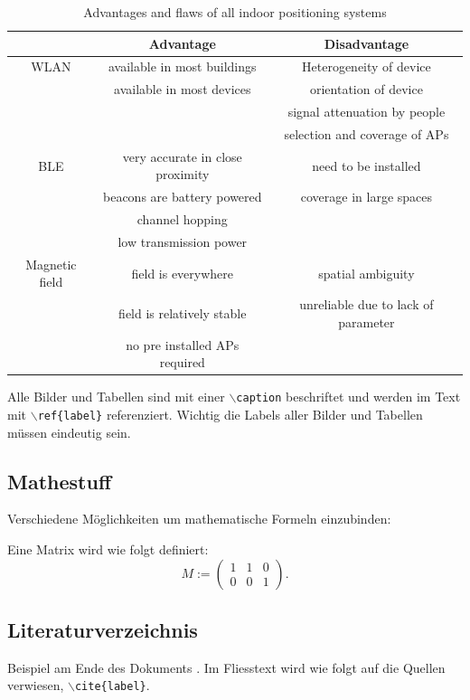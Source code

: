 	 \begin{table}[ht]
		\caption{Advantages and flaws of all indoor positioning systems}
		\label{pro-con}
		\begin{center}
			\begin{tabular}{|c|c|c|} \hline
				& Advantage & Disadvantage \\ \hline
				WLAN & available in most buildings & Heterogeneity of device \\
				& available in most devices & orientation of device \\
				&  & signal attenuation by people \\
				&  & selection and coverage of APs \\ \hline
				BLE & very accurate in close proximity & need to be installed \\
				& beacons are battery powered & coverage in large spaces \\
				& channel hopping & \\
				& low transmission power & \\ \hline
				Magnetic field & field is everywhere & spatial ambiguity \\
				& field is relatively stable & unreliable due to lack of parameter \\
				& no pre installed APs required & \\ \hline
			\end{tabular}
		\end{center}
	\end{table}

	Alle Bilder und Tabellen sind mit einer \texttt{$\backslash$caption} beschriftet und werden im Text mit \texttt{$\backslash$ref\{label\}} referenziert.
	Wichtig die Labels aller Bilder und Tabellen müssen eindeutig sein.
	
	
	\subsection{Mathestuff}
	
	Verschiedene Möglichkeiten um mathematische Formeln einzubinden:
	
	Eine Matrix wird wie folgt definiert:
	\[
		M := \begin{pmatrix}
			1 & 1 & 0 \\
			0 & 0 & 1
		\end{pmatrix}.
	\] 
	
	\subsection{Literaturverzeichnis}
	
	Beispiel am Ende des Dokuments \cite{scriptEawag}.
	Im Fliesstext wird wie folgt auf die Quellen verwiesen,  \texttt{$\backslash$cite\{label\}}.
	
	
	
